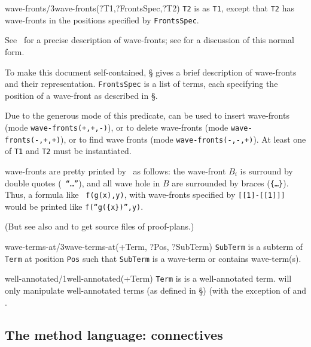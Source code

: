 \begin{predicate}{wave-fronts/3}{wave-fronts(?T1,?FrontsSpec,?T2)}%
{\tt T2} is as {\tt T1}, except that {\tt T2} has wave-fronts in the
positions specified by {\tt FrontsSpec}.  

See~\cite{rp4nn} for a precise description of wave-fronts; see
 for a discussion of this normal form.

To make this document self-contained, \S {}
gives a brief description of wave-fronts and their representation.
{\tt FrontsSpec} is a list of terms, each specifying the position of a
wave-front as described in \S{}.

Due to the generous mode of this predicate,  can be
used to insert wave-fronts (mode {\tt wave-fronts(+,+,-)}), or to
delete wave-fronts (mode {\tt wave-fronts(-,+,+)}), or to find wave
fronts (mode {\tt wave-fronts(-,-,+)}). At least one of {\tt T1} and
{\tt T2} must be instantiated.

 wave-fronts are pretty printed by \clam\ as
follows: the wave-front $B_i$ is surround by double quotes ({\tt
``\ldots''}), and all wave hole in $B$ are surrounded by
 braces ({\tt \{\ldots\}}).  Thus, a formula like {\tt
f(g(x),y)}, with wave-fronts specified by {\tt [[1]-[[1]]]} would be
printed like {\tt f(``g(\{x\})'',y)}.

(But see also  and  to get
 source files of proof-plans.)
\end{predicate}

\begin{predicate}{wave-terms-at/3}{wave-terms-at(+Term, ?Pos, ?SubTerm)}%
{\tt SubTerm} is a subterm of {\tt Term} at position {\tt Pos} such
that {\tt SubTerm} is a wave-term or contains wave-term(s).
\end{predicate}

\begin{predicate}{well-annotated/1}{well-annotated(+Term)}%
{\tt Term} is is a well-annotated term.  \clam will only manipulate
well-annotated terms (as defined in \S{}) (with the
exception of  and .
\end{predicate}



\subsection {The method language: connectives}

